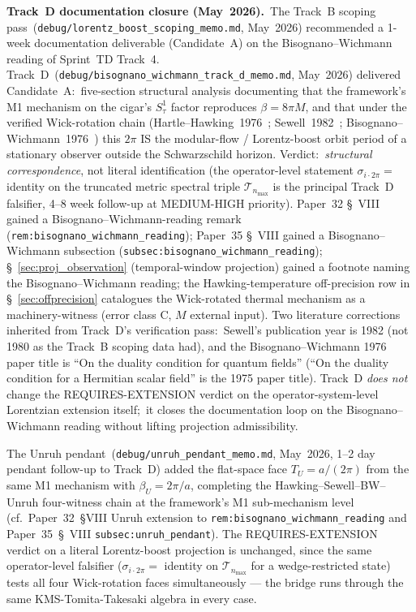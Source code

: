 \documentclass[11pt]{article}
\begin{document}
\begin{enumerate}
\textbf{Track~D documentation closure (May~2026).}\ The Track~B
scoping pass~(\texttt{debug/lorentz\_boost\_scoping\_memo.md},
May~2026) recommended a 1-week documentation deliverable
(Candidate~A) on the Bisognano--Wichmann reading of Sprint~TD
Track~4.  Track~D~(\texttt{debug/bisognano\_wichmann\_track\_d\_memo.md},
May~2026) delivered Candidate~A:\ five-section structural analysis
documenting that the framework's M1 mechanism on the cigar's
$S^1_\tau$ factor reproduces $\beta = 8\pi M$, and that under the
verified Wick-rotation chain
(Hartle--Hawking~1976~\cite{hartle_hawking1976};
 Sewell~1982~\cite{sewell1982};
 Bisognano--Wichmann~1976~\cite{bisognano_wichmann1976}) this $2\pi$
IS the modular-flow / Lorentz-boost orbit period of a stationary
observer outside the Schwarzschild horizon.  Verdict:\ \emph{structural
correspondence}, not literal identification (the operator-level
statement $\sigma_{i\cdot 2\pi} = $ identity on the truncated metric
spectral triple $\mathcal{T}_{n_{\max}}$ is the principal Track~D
falsifier, 4--8 week follow-up at MEDIUM-HIGH priority).  Paper~32
\S~VIII gained a Bisognano--Wichmann-reading remark
(\texttt{rem:bisognano\_wichmann\_reading}); Paper~35 \S~VIII gained
a Bisognano--Wichmann subsection
(\texttt{subsec:bisognano\_wichmann\_reading});
\S~\ref{sec:proj_observation} (temporal-window projection) gained a
footnote naming the Bisognano--Wichmann reading; the
Hawking-temperature off-precision row in
\S~\ref{sec:offprecision} catalogues the Wick-rotated thermal
mechanism as a machinery-witness (error class C, $M$ external
input).  Two literature corrections inherited from Track~D's
verification pass:\ Sewell's publication year is 1982 (not 1980
as the Track~B scoping data had), and the Bisognano--Wichmann 1976
paper title is ``On the duality condition for quantum fields''
(``On the duality condition for a Hermitian scalar field'' is the
1975 paper title).  Track~D \emph{does not} change the
REQUIRES-EXTENSION verdict on the operator-system-level Lorentzian
extension itself;\ it closes the documentation loop on the
Bisognano--Wichmann reading without lifting projection
admissibility.

The Unruh pendant~(\texttt{debug/unruh\_pendant\_memo.md}, May~2026,
1--2 day pendant follow-up to Track~D) added the flat-space face
$T_U = a/(2\pi)$ from the same M1 mechanism with $\beta_U = 2\pi/a$,
completing the Hawking--Sewell--BW--Unruh four-witness chain at the
framework's M1 sub-mechanism level (cf.~Paper~32~§VIII Unruh
extension to \texttt{rem:bisognano\_wichmann\_reading} and
Paper~35~\S~VIII \texttt{subsec:unruh\_pendant}).  The
REQUIRES-EXTENSION verdict on a literal Lorentz-boost projection is
unchanged, since the same operator-level falsifier
($\sigma_{i\cdot 2\pi} = $ identity on $\mathcal{T}_{n_{\max}}$ for
a wedge-restricted state) tests all four Wick-rotation faces
simultaneously --- the bridge runs through the same
KMS-Tomita-Takesaki algebra in every case.

\end{enumerate}
\end{document}
